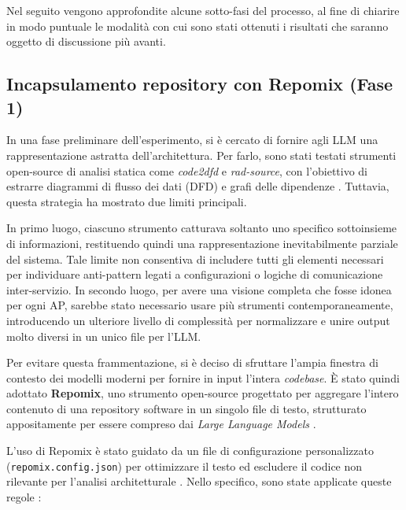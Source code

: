 Nel seguito vengono approfondite alcune sotto-fasi del processo, al fine di chiarire in modo puntuale le modalità con cui sono stati ottenuti i risultati che saranno oggetto di discussione più avanti.

\subsection{Incapsulamento repository con Repomix (Fase 1)}

In una fase preliminare dell'esperimento, si è cercato di fornire agli LLM una rappresentazione astratta dell'architettura. Per farlo, sono stati testati strumenti open-source di analisi statica come \textit{code2dfd} e \textit{rad-source}, con l'obiettivo di estrarre diagrammi di flusso dei dati (DFD) e grafi delle dipendenze \cite{Static_Tool, cloudhubs_rad_source, Code2DFD23}. Tuttavia, questa strategia ha mostrato due limiti principali.

In primo luogo, ciascuno strumento catturava soltanto uno specifico sottoinsieme di informazioni, restituendo quindi una rappresentazione inevitabilmente parziale del sistema. Tale limite non consentiva di includere tutti gli elementi necessari per individuare anti-pattern legati a configurazioni o logiche di comunicazione inter-servizio. In secondo luogo, per avere una visione completa che fosse idonea per ogni AP, sarebbe stato necessario usare più strumenti contemporaneamente, introducendo un ulteriore livello di complessità per normalizzare e unire output molto diversi in un unico file per l'LLM.

Per evitare questa frammentazione, si è deciso di sfruttare l'ampia finestra di contesto dei modelli moderni per fornire in input l'intera \textit{codebase}. È stato quindi adottato \textbf{Repomix}, uno strumento open-source progettato per aggregare l'intero contenuto di una repository software in un singolo file di testo, strutturato appositamente per essere compreso dai \textit{Large Language Models} \cite{repomix2026}.

L'uso di Repomix è stato guidato da un file di configurazione personalizzato (\texttt{repomix.config.json}) per ottimizzare il testo ed escludere il codice non rilevante per l'analisi architetturale \cite{repomix2026}. Nello specifico, sono state applicate queste regole \cite{repomix2026}:


